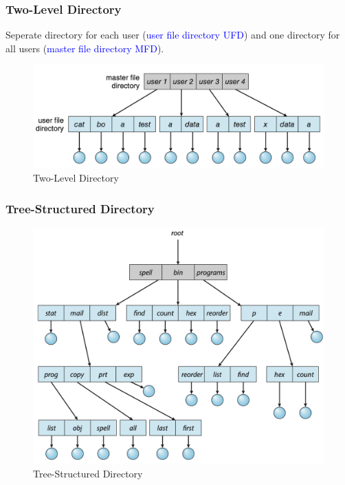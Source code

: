 \documentclass[oneside]{book}
\begin{document}
                    \subsubsection{Two-Level Directory}
                        Seperate directory for each user (\textcolor{blue}{user file directory UFD}) and one directory for all users
                        (\textcolor{blue}{master file directory MFD}).\\
                        \begin{figure}[H]
                            \centering
                            \includegraphics[width=0.6\linewidth]{figures/two_level_dir.png}
                            \caption{Two-Level Directory}
                        \end{figure}
                    \subsubsection{Tree-Structured Directory}
                        \begin{figure}[H]
                            \centering
                            \includegraphics[width=0.6\linewidth]{figures/tree_dir.png}
                            \caption{Tree-Structured Directory}
                        \end{figure}
\end{document}
